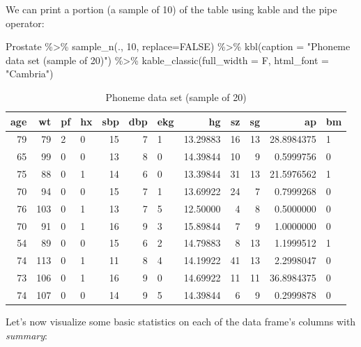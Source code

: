 \documentclass[
]{article}
\newenvironment{Shaded}{\begin{snugshade}}{\end{snugshade}}
\newcommand{\AttributeTok}[1]{\textcolor[rgb]{0.77,0.63,0.00}{#1}}
\newcommand{\ConstantTok}[1]{\textcolor[rgb]{0.00,0.00,0.00}{#1}}
\newcommand{\DecValTok}[1]{\textcolor[rgb]{0.00,0.00,0.81}{#1}}
\newcommand{\FunctionTok}[1]{\textcolor[rgb]{0.00,0.00,0.00}{#1}}
\newcommand{\NormalTok}[1]{#1}
\newcommand{\SpecialCharTok}[1]{\textcolor[rgb]{0.00,0.00,0.00}{#1}}
\newcommand{\StringTok}[1]{\textcolor[rgb]{0.31,0.60,0.02}{#1}}
\begin{document}
We can print a portion (a sample of 10) of the table using kable and the
pipe operator:

\begin{Shaded}
\begin{Highlighting}[]
\NormalTok{Prostate }\SpecialCharTok{\%\textgreater{}\%}
  \FunctionTok{sample\_n}\NormalTok{(., }\DecValTok{10}\NormalTok{, }\AttributeTok{replace=}\ConstantTok{FALSE}\NormalTok{) }\SpecialCharTok{\%\textgreater{}\%} 
  \FunctionTok{kbl}\NormalTok{(}\AttributeTok{caption =} \StringTok{"Phoneme data set (sample of 20)"}\NormalTok{) }\SpecialCharTok{\%\textgreater{}\%}
  \FunctionTok{kable\_classic}\NormalTok{(}\AttributeTok{full\_width =}\NormalTok{ F, }\AttributeTok{html\_font =} \StringTok{"Cambria"}\NormalTok{)}
\end{Highlighting}
\end{Shaded}

\begin{table}

\caption{\label{tab:unnamed-chunk-6}Phoneme data set (sample of 20)}
\centering
\begin{tabular}[t]{r|r|l|l|r|r|l|r|r|r|r|l}
\hline
age & wt & pf & hx & sbp & dbp & ekg & hg & sz & sg & ap & bm\\
\hline
79 & 79 & 2 & 0 & 15 & 7 & 1 & 13.29883 & 16 & 13 & 28.8984375 & 1\\
\hline
65 & 99 & 0 & 0 & 13 & 8 & 0 & 14.39844 & 10 & 9 & 0.5999756 & 0\\
\hline
75 & 88 & 0 & 1 & 14 & 6 & 0 & 13.39844 & 31 & 13 & 21.5976562 & 1\\
\hline
70 & 94 & 0 & 0 & 15 & 7 & 1 & 13.69922 & 24 & 7 & 0.7999268 & 0\\
\hline
76 & 103 & 0 & 1 & 13 & 7 & 5 & 12.50000 & 4 & 8 & 0.5000000 & 0\\
\hline
70 & 91 & 0 & 1 & 16 & 9 & 3 & 15.89844 & 7 & 9 & 1.0000000 & 0\\
\hline
54 & 89 & 0 & 0 & 15 & 6 & 2 & 14.79883 & 8 & 13 & 1.1999512 & 1\\
\hline
74 & 113 & 0 & 1 & 11 & 8 & 4 & 14.19922 & 41 & 13 & 2.2998047 & 0\\
\hline
73 & 106 & 0 & 1 & 16 & 9 & 0 & 14.69922 & 11 & 11 & 36.8984375 & 0\\
\hline
74 & 107 & 0 & 0 & 14 & 9 & 5 & 14.39844 & 6 & 9 & 0.2999878 & 0\\
\hline
\end{tabular}
\end{table}

Let's now visualize some basic statistics on each of the data frame's
columns with \emph{summary}:
\end{document}
